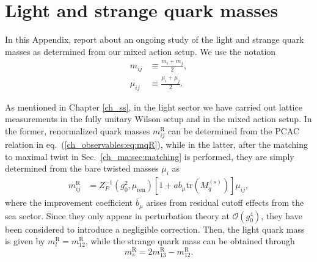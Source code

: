 
\chapter{Light and strange quark masses}
\label{apex_light_qm}

In this Appendix, report about an ongoing study of the light and strange quark masses as determined from our mixed action setup. We use the notation
\begin{align}
m_{ij}&\equiv\frac{m_i+m_j}{2}, \\
\mu_{ij}&\equiv\frac{\mu_i+\mu_j}{2}.
\end{align}

As mentioned in Chapter \ref{ch_ss}, in the light sector we have carried out lattice measurements in the fully unitary Wilson setup and in the mixed action setup. In the former, renormalized quark masses $m_{ij}^{\textrm{R}}$ can be determined from the PCAC relation in eq.~(\ref{ch_observables:eq:mqR}), while in the latter, after the matching to maximal twist in Sec.~\ref{ch_ma:sec:matching} is performed, they are simply determined from the bare twisted masses $\mu_i$ as
\begin{align}
m_{ij}^{\textrm{R}}&=Z_P^{-1}(g_0^2,\mu_{\textrm{ren}})\left[1+a\overline{b}_\mu\textrm{tr}\left(M_q^{(s)}\right)\right]\mu_{ij},
\end{align}
where the improvement coefficient $\overline{b}_{\mu}$ arises from residual cutoff effects from the sea sector. Since they only  appear in perturbation theory at $\mathcal{O}(g_0^4)$, they have been considered to introduce a negligible correction. Then, the light quark mass is given by $m_{l}^{\textrm{R}}=m_{12}^{\textrm{R}}$, while the strange quark mass can be obtained through
\begin{equation}
m_s^{\textrm{R}}=2m_{13}^{\textrm{R}}-m_{12}^{\textrm{R}}.
\end{equation}

